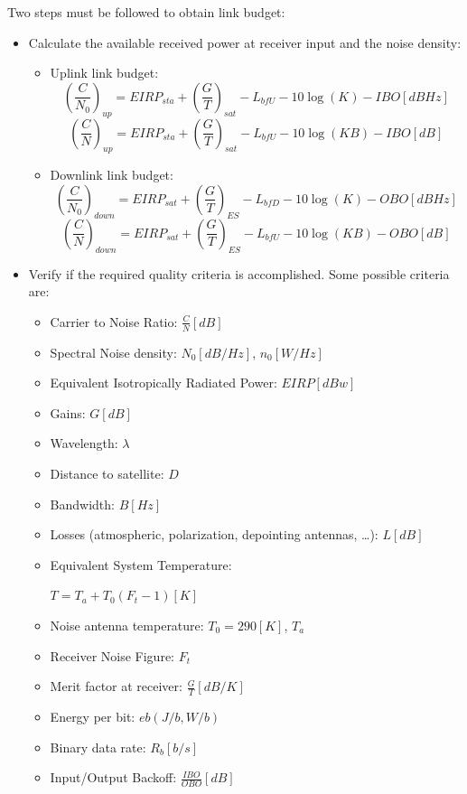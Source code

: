 \documentclass[../main.tex]{subfiles}
\begin{document}
Two steps must be followed to obtain link budget:
\begin{itemize}
	\item {
		Calculate the available received power at receiver input and the noise density:
		\begin{itemize}
			\item {
				Uplink link budget:
				$$
					\left( \frac {C} {N_0} \right)_{up} = EIRP_{sta} + \left( \frac {G} {T} \right)_{sat} - L_{bfU} - 10 \log(K) - IBO [dBHz]
				$$
				$$
					\left( \frac {C} {N} \right)_{up} = EIRP_{sta} + \left( \frac {G} {T} \right)_{sat} - L_{bfU} - 10 \log(KB) - IBO [dB]
				$$
			}
			\item {
				Downlink link budget:
				$$
					\left( \frac {C} {N_0} \right)_{down} = EIRP_{sat} + \left( \frac {G} {T} \right)_{ES} - L_{bfD} - 10 \log(K) - OBO [dBHz]
				$$
				$$
					\left( \frac {C} {N} \right)_{down} = EIRP_{sat} + \left( \frac {G} {T} \right)_{ES} - L_{bfU} - 10 \log(KB) - OBO [dB]
				$$
			}
		\end{itemize}
	}
	\item {
		Verify if the required quality criteria is accomplished. Some possible criteria are:
		\begin{itemize}
			\item Carrier to Noise Ratio: $\frac {C} {N} [dB]$
			\item Spectral Noise density: $N_0 [dB/Hz]$, $n_0 [W/Hz]$
			\item Equivalent Isotropically Radiated Power: $EIRP [dBw]$
			\item Gains: $G [dB]$
			\item Wavelength: $\lambda$
			\item Distance to satellite: $D$
			\item Bandwidth: $B [Hz]$
			\item Losses (atmospheric, polarization, depointing antennas, \ldots): $L [dB]$
			\item {
				Equivalent System Temperature:

				$T = T_a + T_0 (F_t - 1) [K]$
			}
			\item Noise antenna temperature: $T_0 = 290 [K]$, $T_a$
			\item Receiver Noise Figure: $F_t$
			\item Merit factor at receiver: $\frac {G} {T} [dB/K]$
			\item Energy per bit: $eb (J/b, W/b)$
			\item Binary data rate: $R_b [b/s]$
			\item Input/Output Backoff: $\frac {IBO} {OBO} [dB]$
		\end{itemize}
	}
\end{itemize}
\end{document}
